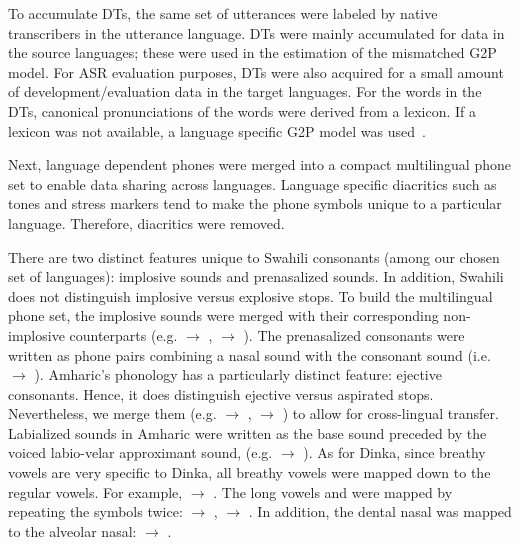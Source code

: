 \documentclass[a4paper]{article}
\begin{document}
To accumulate DTs, the same set of utterances were labeled by native transcribers in the utterance language. 
DTs were mainly accumulated for data in the source languages; these  were used in the estimation of the mismatched G2P model. For ASR evaluation purposes, DTs were also acquired for a small amount of development/evaluation data in the target languages. For the words in the DTs, canonical pronunciations of the words were derived from a lexicon. If a lexicon was not available, a language specific G2P model was used~\cite{MarkG2P}.

Next, language dependent phones were merged into a compact multilingual phone set to enable data sharing across languages. Language specific diacritics such as tones and stress markers tend to make the phone symbols unique to a particular language. Therefore,  diacritics were removed. 

There are two distinct features unique to Swahili consonants (among our chosen set of languages): implosive sounds and prenasalized sounds. In addition, Swahili does not distinguish implosive versus explosive stops. To build the multilingual phone set, the implosive sounds were merged with their corresponding non-implosive counterparts (e.g.  $\rightarrow$ ,  $\rightarrow$ ). The prenasalized consonants were written as phone pairs combining a nasal sound with the consonant sound (i.e.  $\rightarrow$  ). Amharic's phonology has a particularly distinct feature: ejective consonants. Hence, it does distinguish ejective versus aspirated stops. Nevertheless, we merge them (e.g.  $\rightarrow$ ,  $\rightarrow$ ) to allow for cross-lingual transfer. Labialized sounds in Amharic were written as the base sound preceded by the voiced labio-velar approximant sound,  (e.g.  $\rightarrow$  ). As for Dinka, since breathy vowels are very specific to Dinka, all breathy vowels were mapped down to the regular vowels. For example,  $\rightarrow$ . The long vowels  and  were mapped by repeating the symbols twice:  $\rightarrow$ ,  $\rightarrow$ . In addition, the dental nasal was mapped to the alveolar nasal: \textipa{\|[n} $\rightarrow$ . 

\end{document}

